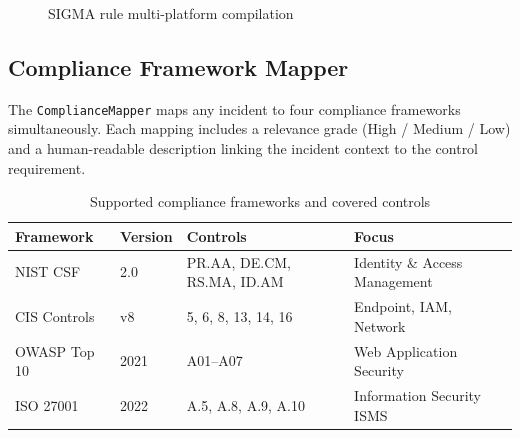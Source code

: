 \documentclass[12pt,a4paper]{article}
\begin{document}
\begin{figure}[H]
\centering
{}
\caption{SIGMA rule multi-platform compilation}
\end{figure}

\subsection{Compliance Framework Mapper}

The \texttt{ComplianceMapper} maps any incident to four compliance frameworks simultaneously.
Each mapping includes a relevance grade (High / Medium / Low) and a human-readable description
linking the incident context to the control requirement.

\begin{table}[H]
\centering
\caption{Supported compliance frameworks and covered controls}
\begin{tabular}{llll}
\toprule
\textbf{Framework} & \textbf{Version} & \textbf{Controls} & \textbf{Focus} \\
\midrule
NIST CSF    & 2.0  & PR.AA, DE.CM, RS.MA, ID.AM & Identity \& Access Management \\
CIS Controls & v8   & 5, 6, 8, 13, 14, 16        & Endpoint, IAM, Network \\
OWASP Top 10 & 2021 & A01--A07                   & Web Application Security \\
ISO 27001   & 2022 & A.5, A.8, A.9, A.10        & Information Security ISMS \\
\bottomrule
\end{tabular}
\end{table}

\end{document}
